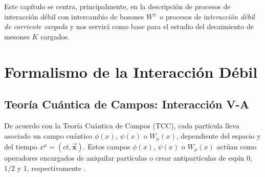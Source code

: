 Este capítulo se centra, principalmente, en la descripción de procesos de interacción débil con intercambio de bosones $W^{\pm}$ o procesos de in\textit{teracción débil de corriente cargada} y nos servirá como base para el estudio del decaimiento de mesones $K$ cargados.

\section{Formalismo de la Interacción Débil}\label{cap:formalism}
\subsection{Teoría Cuántica de Campos: Interacción V-A}\label{sec:QFT}
De acuerdo con la Teoría Cuántica de Campos (TCC), cada partícula lleva asociado un campo cuántico $\phi(x)$, $\psi(x)$ o $W_{\mu}(x)$, dependiente del espacio y del tiempo $x^{\mu}=(ct,\boldsymbol{\vec{x}})$\protect\footnotemark. Estos campos $\phi(x)$, $\psi(x)$ o $W_{\mu}(x)$ actúan como operadores encargados de aniquilar partículas o crear antipartículas de espín $0$, $1/2 $ y $1$, respectivamente \cite{notas2020}.

 
